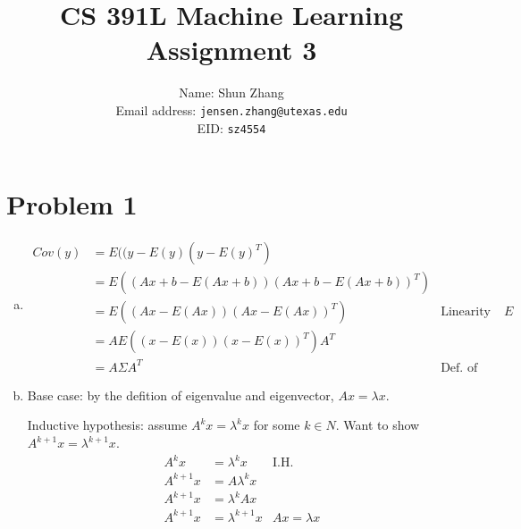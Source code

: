 \documentclass[10pt]{article}
\title{CS 391L Machine Learning Assignment 3}
\author{Name: Shun Zhang\\
Email address: \texttt{jensen.zhang@utexas.edu}\\
EID: \texttt{sz4554}}
\date{}
\begin{document}
\maketitle

\section*{Problem 1}

\begin{enumerate}[(a)]

\item \begin{align}
Cov(y) &= E((y - E(y)(y - E(y)^T)\\
&= E((Ax + b - E(Ax + b))(Ax + b - E(Ax + b))^T)\\
&= E((Ax - E(Ax))(Ax - E(Ax))^T) &\text{Linearity of $E$}\\
&= AE((x - E(x))(x - E(x))^T)A^T\\
&= A\Sigma A^T &\text{Def. of Cov.}
\end{align}

\item Base case: by the defition of eigenvalue and eigenvector, $Ax =
\lambda x$.

Inductive hypothesis: assume $A^k x = \lambda^k x$ for some $k \in N$.
Want to show $A^{k+1} x = \lambda^{k+1} x$.
\begin{align}
A^k x &= \lambda^k x &\text{I.H.}\\
A^{k+1} x &= A \lambda^k x\\
A^{k+1} x &= \lambda^k Ax\\
A^{k+1} x &= \lambda^{k+1} x &Ax = \lambda x
\end{align}

\end{enumerate}
\end{document}
